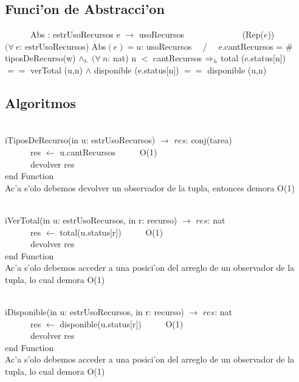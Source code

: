 \documentclass[a4paper,10pt]{article}
\begin{document}
\subsection{Funci'on de Abstracci'on}

   \indent \ \ \ \ \ \ Abs : estrUsoRecursos e $\rightarrow$ usoRecursos \ \ \ \ \ \ \ \ \ \ \ \ \ (Rep($e$))\\
   
   $(\forall\ e$: estrUsoRecursos) {Abs$(e) = u$: usoRecursos} \ \ / \ \ 
e.cantRecursos = $\#$ tiposDeRecurso(w) $\land_{\mathrm{\scriptscriptstyle{L}}}$ $(\forall\ n$: nat) n $<$ cantRecursos $\Rightarrow_{\mathrm{\scriptscriptstyle{L}}}$ total (e.status[n]) $==$ verTotal (u,n) $\wedge$  disponible (e.status[n]) $==$ disponible (u,n)  \\

\newpage
\subsection{Algoritmos}

\begin{algoritmo}
\caption{}\\
  iTiposDeRecurso(in u: estrUsoRecursos) $\rightarrow$ $res$: conj(tarea) \\
    \indent \ \ \ \ \ \  res $\gets$ u.cantRecursos   \ \ \ \ \ O(1)\\   
    \indent \ \ \ \ \ \  devolver res    \\
   end Function \\
   
   Ac'a s'olo debemos devolver un observador de la tupla, entonces demora O(1)
\end{algoritmo}

\begin{algoritmo}
\caption{}\\
  iVerTotal(in u: estrUsoRecursos, in r: recurso) $\rightarrow$ $res$: nat \\
	\indent \ \ \ \ \ \  res $\gets$ total(u.status[r])   \ \ \ \ \ O(1)\\   
   	\indent \ \ \ \ \ \  devolver res    \\
 end Function \\
   
   Ac'a s'olo debemos acceder a una posici'on del arreglo de un observador de la tupla, lo cual demora O(1)
\end{algoritmo}

\begin{algoritmo}
\caption{}\\
  iDisponible(in u: estrUsoRecursos, in r: recurso) $\rightarrow$ $res$: nat \\
	\indent \ \ \ \ \ \  res $\gets$ disponible(u.status[r])   \ \ \ \ \ O(1)\\   
   	\indent \ \ \ \ \ \  devolver res    \\
   end Function \\
   
   Ac'a s'olo debemos acceder a una posici'on del arreglo de un observador de la tupla, lo cual demora O(1)
\end{algoritmo}
\end{document}
